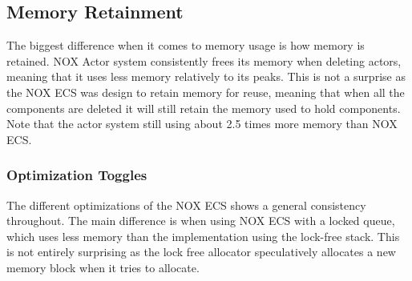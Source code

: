 \subsection{Memory Retainment}
The biggest difference when it comes to memory usage is how memory is retained.
NOX Actor system consistently frees its memory when deleting actors, meaning that it uses less memory relatively to its peaks.
This is not a surprise as the NOX ECS was design to retain memory for reuse, meaning that when all the components are deleted
it will still retain the memory used to hold components.
Note that the actor system still using about 2.5 times more memory than NOX ECS.

\subsubsection{Optimization Toggles}
The different optimizations of the NOX ECS shows a general consistency throughout.
The main difference is when using NOX ECS with a locked queue, which uses less memory than the implementation using the lock-free stack.
This is not entirely surprising as the lock free allocator speculatively allocates a new memory block when it tries to allocate.

